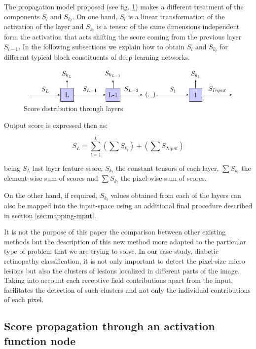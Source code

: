 \documentclass[preprint]{elsarticle}
\theoremstyle{definition} %
\theoremstyle{remark}
\begin{document}
The propagation model proposed (see fig. \ref{fig:score_map}) makes a different treatment of the components $S_l$ and $S_{k_l}$. On one hand, $S_l$ is a linear transformation of the activation of the layer and $S_{k_l}$ is a tensor of the same dimensions independent form the activation that acts shifting the score coming from the previous layer $S_{l-1}$. In the following subsections we explain how to obtain $S_l$ and $S_{k_l}$ for different typical block constituents of deep learning networks.

\begin{figure}[h!]
	\centering
	\includegraphics{figures/score_map.pdf}
	\caption{Score distribution through layers}
	\label{fig:score_map}
\end{figure}

Output score is expressed then as:

\begin{equation}
S_L = \sum_{l=1}^L \left ( \sum S_{k_l} \right ) + \left ( \sum S_{Input} \right )
\end{equation}

being $S_L$ last layer feature score, $S_{k_l}$ the constant tensors of each layer, $\sum S_{k_l}$ the element-wise sum of scores and $\sum S_{k_l}$ the pixel-wise sum of scores.

On the other hand, if required, $S_{k_l}$ values obtained from each of the layers can also be mapped into the input-space using an additional final procedure described in section \ref{sec:mapping-input}.

It is not the purpose of this paper the comparison between other existing methods but the description of this new method more adapted to the particular type of problem that we are trying to solve. In our case study, diabetic retinopathy classification, it is not only important to detect the pixel-size micro lesions but also the clusters of lesions localized in different parts of the image. Taking into account each receptive field contributions apart from the input, facilitates the detection of such clusters and not only the individual contributions of each pixel. 

\subsection{Score propagation through an activation function node} 
\end{document}
